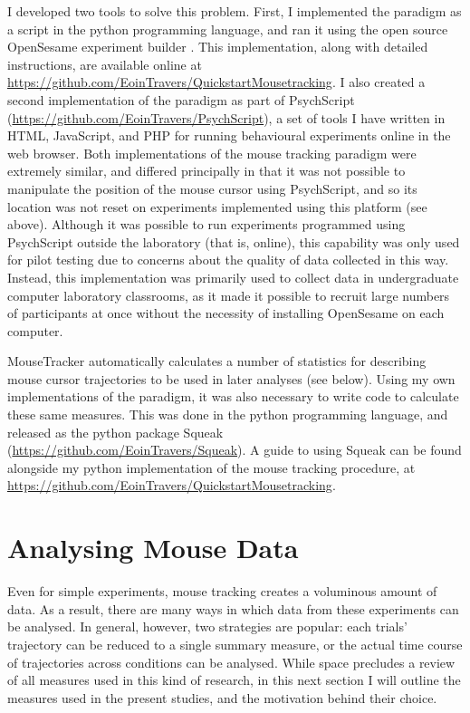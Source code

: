 I developed two tools to solve this problem.
First, I implemented the paradigm
as a script in the python programming language,
and ran it using the open source OpenSesame experiment builder \citep{Mathot2011a}.
This implementation, along with detailed instructions,
are available online at
\hspace*{4pt}\url{https://github.com/EoinTravers/QuickstartMousetracking}.
I also created a second implementation of the paradigm as part of
PsychScript
(\url{https://github.com/EoinTravers/PsychScript}),
a set of tools I have written in HTML, JavaScript, and PHP
for running behavioural experiments online in the web browser.
Both implementations of the mouse tracking paradigm were extremely similar,
and differed principally in that 
it was not possible to manipulate 
the position of the mouse cursor using PsychScript, 
and so its location was not reset on experiments implemented using this platform
(see above).
Although it was possible to run experiments
programmed using PsychScript outside the laboratory (that is, online),
this capability was only used for pilot testing
due to concerns about the quality of data collected in this way.
Instead, this implementation was primarily used
to collect data in undergraduate computer laboratory classrooms,
as it made it possible to recruit large numbers of participants at once
without the necessity of installing OpenSesame on each computer.

MouseTracker automatically calculates a number of statistics
for describing mouse cursor trajectories
to be used in later analyses (see below).
Using my own implementations of the paradigm,
it was also necessary to write code to calculate these same measures.
This was done in the python programming language,
and released as the python package Squeak
(\url{https://github.com/EoinTravers/Squeak}).
A guide to using Squeak can be found alongside
my python implementation of the mouse tracking procedure,
at \url{https://github.com/EoinTravers/QuickstartMousetracking}.




\section{Analysing Mouse Data}\label{sec:mousetracking-analysing}

Even for simple experiments, mouse tracking creates a voluminous amount of data.
As a result, there are many ways in which data from these experiments can be analysed.
In general, however, two strategies are popular:
each trials' trajectory can be reduced to a single summary measure,
or the actual time course of trajectories across conditions can be analysed.
While space precludes a review of all measures used in this kind of research,
in this next section I will outline the measures used in the present studies,
and the motivation behind their choice.

